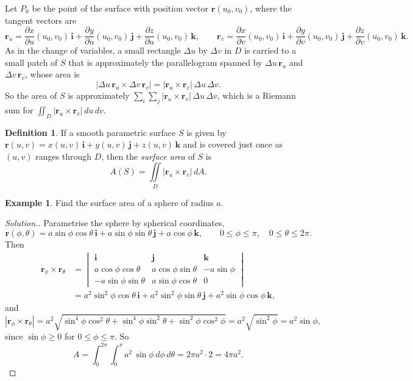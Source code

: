 \documentclass[11pt,a4paper]{article}
\theoremstyle{definition}
\newtheorem{defn}[thm]{Definition}
\newtheorem{exa}[thm]{Example}
\newenvironment{solution}
  {\renewcommand{\qedsymbol}{}\begin{proof}[\textit{Solution}.]}
  {\end{proof}}
\begin{document}
Let $P_0$ be the point of the surface with position vector
$\mathbf r(u_0,v_0)$, where the tangent vectors are
\[\mathbf r_u = \frac{\partial x}{\partial u}(u_0,v_0)\,\mathbf i +
\frac{\partial y}{\partial u}(u_0,v_0)\,\mathbf j + \frac{\partial z}{\partial
u}(u_0,v_0)\,\mathbf k ,\qquad \mathbf r_v = \frac{\partial x}{\partial
v}(u_0,v_0)\,\mathbf i + \frac{\partial y}{\partial v}(u_0,v_0)\,\mathbf j +
\frac{\partial z}{\partial v}(u_0,v_0)\,\mathbf k .\]
As in the change of variables, a small rectangle $\Delta u$ by $\Delta v$ in $D$
is carried to a small patch of $S$ that is approximately the parallelogram
spanned by $\Delta u\,\mathbf r_u$ and $\Delta v\,\mathbf r_v$, whose area is
\[|\Delta u \, \mathbf r_u \times \Delta v \, \mathbf r_v| = |\mathbf r_u \times
\mathbf r_v| \,\Delta u \, \Delta v .\]
So the area of $S$ is approximately
$\sum_{i}\sum_{j}|\mathbf r_u \times \mathbf r_v| \,\Delta u \, \Delta v$, which
is a Riemann sum for $\iint_D |\mathbf r_u \times \mathbf r_v|\,du\,dv$.

\begin{defn}
\label{defn:surfacearea}
If a smooth parametric surface $S$ is given by
$\mathbf r(u,v) = x (u,v)\, \mathbf i + y (u,v) \,\mathbf j + z (u,v) \,\mathbf
k$ and is covered just once as $(u,v)$ ranges through $D$, then the
\emph{surface area} of $S$ is
\[A(S) = \iint\limits_D |\mathbf r_u \times \mathbf r_v| \,dA .\]
\end{defn}

\begin{exa}
\label{ex:spherearea}
Find the surface area of a sphere of radius $a$.
\end{exa}

\begin{solution}
Parametrise the sphere by spherical coordinates,
\[\mathbf r(\phi, \theta) = a \sin \phi \cos \theta \,\mathbf i + a \sin \phi
\sin \theta \,\mathbf j + a \cos \phi \,\mathbf k ,\qquad 0\leq\phi\leq\pi,\quad
0\leq\theta\leq 2\pi .\]
Then
\begin{align*}
\mathbf r_{\phi} \times \mathbf r_{\theta} & = \begin{vmatrix}
\mathbf i & \mathbf j & \mathbf k\\
a\cos \phi \cos \theta & a \cos \phi \sin \theta & -a \sin \phi\\
-a\sin \phi \sin \theta & a \sin \phi \cos \theta & 0
\end{vmatrix}\\
& = a^2\sin^2\phi \cos \theta \,\mathbf i + a^2 \sin^2\phi \sin \theta \,\mathbf
j + a^2 \sin \phi \cos \phi \,\mathbf k ,
\end{align*}
and
\[|\mathbf r_{\phi} \times \mathbf r_{\theta}| = a^2\sqrt{\sin^4\phi\cos^2\theta
+ \sin^4\phi\sin^2\theta + \sin^2\phi\cos^2\phi} = a^2\sqrt{\sin^2\phi} = a^2
\sin \phi ,\]
since $\sin\phi\geq 0$ for $0\leq\phi\leq\pi$. So
\[A = \int^{2\pi}_0 \int^{\pi}_0 a^2\,\sin\phi \, d\phi \, d\theta = 2\pi a^2\cdot
2 = 4\pi a^2 .\]
\end{solution}
\end{document}
